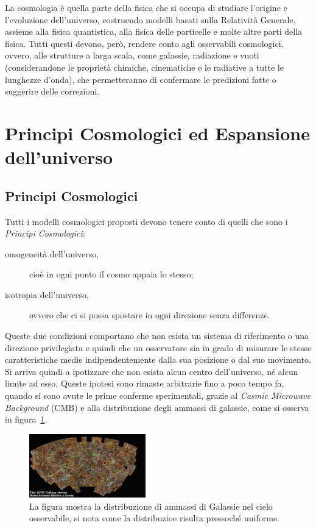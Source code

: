 La cosmologia è quella parte della fisica che si occupa di studiare l'origine e l'evoluzione dell'universo, costruendo modelli basati sulla Relatività Generale, assieme alla fisica quantistica, alla fisica delle particelle e molte altre parti della fisica. Tutti questi devono, però, rendere conto agli osservabili cosmologici, ovvero, alle strutture a larga scala, come galassie, radiazione e vuoti (considerandone le proprietà chimiche, cinematiche e le radiative a tutte le lunghezze d'onda), che permetteranno di confermare le predizioni fatte o suggerire delle correzioni.
\section{Principi Cosmologici ed Espansione dell'universo}\label{sec:principi-espansione}
\subsection{Principi Cosmologici}\label{sec:principi-cosmologici}

Tutti i modelli cosmologici proposti devono tenere conto di quelli che sono i \textit{Principi Cosmologici}:
\begin{description}
    \item[omogeneità dell'universo,]cioè in ogni punto il cosmo appaia lo stesso;
    \item[isotropia dell'universo,]ovvero che ci si possa spostare in ogni direzione senza differenze.
\end{description}
Queste due condizioni comportano che non esista un sistema di riferimento o una direzione privilegiata e quindi che un osservatore sia in grado di misurare le stesse caratteristiche medie indipendentemente dalla sua posizione o dal suo movimento. Si arriva quindi a ipotizzare che non esista alcun centro dell'universo, né alcun limite ad esso. Queste ipotesi sono rimaste arbitrarie fino a poco tempo fa, quando si sono avute le prime conferme sperimentali, grazie al \textit{Casmic Microwave Background} (CMB) e alla distribuzione degli ammassi di galassie, come si osserva in figura~\ref{fig:APM}.
\begin{figure}
    \centering
    \includegraphics[width=0.45\textwidth]{immagini/APM.jpg}
    \caption{La figura mostra la distribuzione di ammassi di Galassie nel cielo osservabile, si nota come la distribuzioe risulta pressoché uniforme.}\label{fig:APM}
\end{figure}
